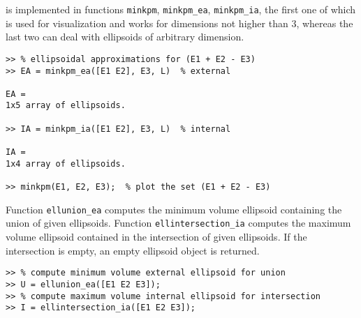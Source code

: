 is implemented in
functions {\tt minkpm}, {\tt minkpm\_ea}, {\tt minkpm\_ia}, the first one of
which is used for visualization and works for dimensions not higher than $3$,
whereas the last two can deal with ellipsoids of arbitrary dimension.
{\tt \begin{verbatim}
>> % ellipsoidal approximations for (E1 + E2 - E3)
>> EA = minkpm_ea([E1 E2], E3, L)  % external

EA =
1x5 array of ellipsoids.

>> IA = minkpm_ia([E1 E2], E3, L)  % internal

IA =
1x4 array of ellipsoids.

>> minkpm(E1, E2, E3);  % plot the set (E1 + E2 - E3)
\end{verbatim} }
Function {\tt ellunion\_ea} computes the minimum volume ellipsoid
containing the union of given ellipsoids.
Function {\tt ellintersection\_ia} computes the maximum volume ellipsoid
contained in the intersection of given ellipsoids.
If the intersection is empty, an empty ellipsoid object is returned.
{\tt \begin{verbatim}
>> % compute minimum volume external ellipsoid for union
>> U = ellunion_ea([E1 E2 E3]);
>> % compute maximum volume internal ellipsoid for intersection
>> I = ellintersection_ia([E1 E2 E3]);
\end{verbatim} }

